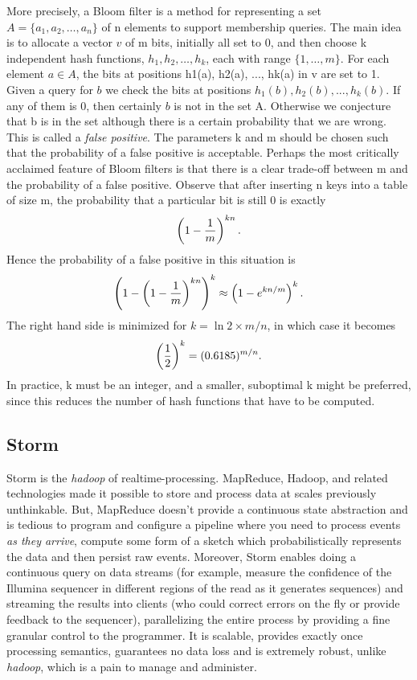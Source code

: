 \documentclass[11pt]{article}
\begin{document}
More precisely, a Bloom filter is a method for representing a set $A = \{a_1, a_2, \ldots, a_n\}$ of n elements to support membership queries. The main idea is to allocate a vector $v$ of m bits, initially all set to 0, and then choose k independent hash functions, $h_1, h_2, \ldots, h_k$, each with range $\{1,\ldots,m\}$. For each element $a \in A$, the bits at positions h1(a), h2(a), ..., hk(a) in v are set to 1. Given a query for $b$ we check the bits at positions $h_1(b), h_2(b), ..., h_k(b).$ If any of them is 0, then certainly $b$ is not in the set A. Otherwise we conjecture that b is in the set although there is a certain probability that we are wrong. This is called a \emph{false positive}. The parameters k and m should be chosen such that the probability of a false positive is acceptable. Perhaps the most critically acclaimed  feature of Bloom filters is that there is a clear trade-off between m and the probability of a false positive. Observe that after inserting n keys into a table of size m, the probability that a particular bit is still 0 is exactly
\begin{displaymath} \left(1 - {1\over m}\right)^{k n}.\end{displaymath}
Hence the probability of a false positive in this situation is
\begin{displaymath} \left( 1 - \left(1 - {1\over m}\right)^{k n} \right)^k \approx \left(1 - e ^ { k n /m} \right)^k .\end{displaymath}
The right hand side is minimized for $k = \ln 2 \times m / n$, in which case it becomes
\begin{displaymath} \left({1\over2} \right) ^k = (0.6185)^{m/n}.\end{displaymath}
In practice, k must be an integer, and a smaller, suboptimal k might be preferred, since this reduces the number of hash functions that have to be computed.

\subsection{Storm}
Storm \cite{storm} is the \emph{hadoop} of realtime-processing. MapReduce, Hadoop, and related technologies made it possible to store and process data at scales previously unthinkable. But, MapReduce doesn't provide a continuous state abstraction and is tedious to program and configure a pipeline where you need to process events \emph{as they arrive}, compute some form of a sketch \cite{bloom} which probabilistically represents the data and then persist raw events. Moreover, Storm enables doing a continuous query on data streams (for example, measure the confidence of the Illumina sequencer in different regions of the read as it generates sequences) and streaming the results into clients (who could correct errors on the fly or provide feedback to the sequencer), parallelizing the entire process by providing a fine granular control to the programmer. It is scalable, provides exactly once processing semantics, guarantees no data loss and is extremely robust, unlike \emph{hadoop}, which is a pain to manage and administer.
\end{document}

